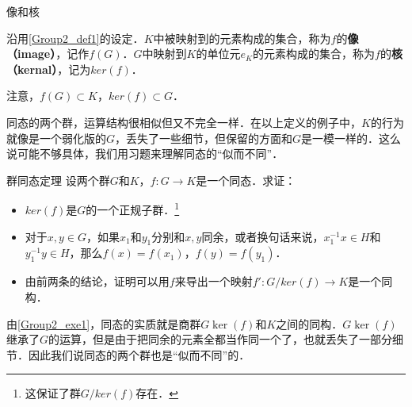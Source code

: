 \begin{definition}{像和核}

沿用\autoref{Group2_def1}的设定．$K$中被映射到的元素构成的集合，称为$f$的\textbf{像（image）}，记作$f(G)$．$G$中映射到$K$的单位元$e_K$的元素构成的集合，称为$f$的\textbf{核（kernal）}，记为$ker(f)$．

\end{definition}

注意，$f(G)\subset K$，$ker(f)\subset G$．

同态的两个群，运算结构很相似但又不完全一样．在以上定义的例子中，$K$的行为就像是一个弱化版的$G$，丢失了一些细节，但保留的方面和$G$是一模一样的．这么说可能不够具体，我们用习题来理解同态的“似而不同”．

\begin{exercise}{群同态定理}\label{Group2_exe1}
设两个群$G$和$K$，$f:G\rightarrow K$是一个同态．求证：
\begin{itemize}
\item $ker(f)$是$G$的一个正规子群．\footnote{这保证了群$G/ker(f)$存在．}
\item 对于$x, y\in G$，如果$x_1$和$y_1$分别和$x, y$同余，或者换句话来说，$x_1^{-1}x\in H$和$y_1^{-1}y\in H$，那么$f(x)=f(x_1)$，$f(y)=f(y_1)$．
\item 由前两条的结论，证明可以用$f$来导出一个映射$f': G/ker(f)\rightarrow K$是一个同构．

\end{itemize}
\end{exercise}

由\autoref{Group2_exe1}，同态的实质就是商群$G\ker(f)$和$K$之间的同构．$G\ker(f)$继承了$G$的运算，但是由于把同余的元素全都当作同一个了，也就丢失了一部分细节．因此我们说同态的两个群也是“似而不同”的．

